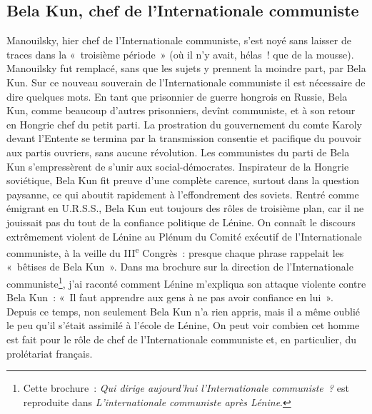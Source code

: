 \documentclass[french,twoside]{book} %
\begin{document}
 \subsection[{Bela Kun, chef de l’Internationale communiste}]{Bela Kun, chef de l’Internationale communiste}
\noindent Manouilsky, hier chef de l’Internationale communiste, s’est noyé sans laisser de traces dans la « troisième période » (où il n’y avait, hélas ! que de la mousse). Manouilsky fut remplacé, sans que les sujets y prennent la moindre part, par Bela Kun. Sur ce nouveau souverain de l’Internationale communiste il est nécessaire de dire quelques mots. En tant que prisonnier de guerre hongrois en Russie, Bela Kun, comme beaucoup d’autres prisonniers, devînt communiste, et à son retour en Hongrie chef du petit parti. La prostration du gouvernement du comte Karoly devant l’Entente se termina par la transmission consentie et pacifique du pouvoir aux partis ouvriers, sans aucune révolution. Les communistes du parti de Bela Kun s’empressèrent de s’unir aux social-démocrates. Inspirateur de la Hongrie soviétique, Bela Kun fit preuve d’une complète carence, surtout dans la question paysanne, ce qui aboutit rapidement à l’effondrement des soviets. Rentré comme émigrant en U.R.S.S., Bela Kun eut toujours des rôles de troisième plan, car il ne jouissait pas du tout de la confiance politique de Lénine. On connaît le discours extrêmement violent de Lénine au Plénum du Comité exécutif de l’Internationale communiste, à la veille du III\textsuperscript{e} Congrès : presque chaque phrase rappelait les « bêtises de Bela Kun ». Dans ma brochure sur la direction de l’Internationale communiste\footnote{ \noindent Cette brochure : \emph{Qui dirige aujourd’hui l’Internationale communiste ?} est reproduite dans \emph{L’internationale communiste après Lénine}.
 }, j’ai raconté comment Lénine m’expliqua son attaque violente contre Bela Kun : « Il faut apprendre aux gens à ne pas avoir confiance en lui ». Depuis ce temps, non seulement Bela Kun n’a rien appris, mais il a même oublié le peu qu’il s’était  assimilé à l’école de Lénine, On peut voir combien cet homme est fait pour le rôle de chef de l’Internationale communiste et, en particulier, du prolétariat français.
\end{document}
